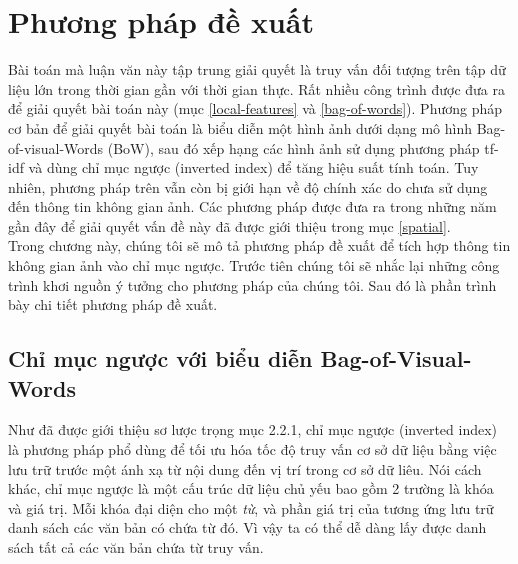 \chapter{Phương pháp đề xuất}
\label{chapter:proposed}
\ifpdf
    \graphicspath{{Chapter3/Chapter3Figs/PNG/}{Chapter3/Chapter3Figs/PDF/}{Chapter3/Chapter3Figs/}}
\else
    \graphicspath{{Chapter3/Chapter3Figs/EPS/}{Chapter3/Chapter3Figs/}}
\fi


Bài toán mà luận văn này tập trung giải quyết là truy vấn đối tượng trên tập dữ liệu lớn trong thời gian gần với thời gian thực. Rất nhiều công trình được đưa ra để giải quyết bài toán này (mục \ref{local-features} và \ref{bag-of-words}). Phương pháp cơ bản để giải quyết bài toán là biểu diễn một hình ảnh dưới dạng mô hình Bag-of-visual-Words (BoW), sau đó xếp hạng các hình ảnh sử dụng phương pháp tf-idf và dùng chỉ mục ngược (inverted index) để tăng hiệu suất tính toán. Tuy nhiên, phương pháp trên vẫn còn bị giới hạn về độ chính xác do chưa sử dụng đến thông tin không gian ảnh. Các phương pháp được đưa ra trong những năm gần đây để giải quyết vấn đề này đã được giới thiệu trong mục \ref{spatial}.\\

Trong chương này, chúng tôi sẽ mô tả phương pháp đề xuất để tích hợp thông tin không gian ảnh vào chỉ mục ngược. Trước tiên chúng tôi sẽ nhắc lại những công trình khơi nguồn ý tưởng cho phương pháp của chúng tôi. Sau đó là phần trình bày chi tiết phương pháp đề xuất.

\section{Chỉ mục ngược với biểu diễn Bag-of-Visual-Words}
Như đã được giới thiệu sơ lược trọng mục 2.2.1, chỉ mục ngược (inverted index) là phương pháp phổ dùng để tối ưu hóa tốc độ truy vấn cơ sở dữ liệu bằng việc lưu trữ trước một ánh xạ từ nội dung đến vị trí trong cơ sở dữ liêu. Nói cách khác, chỉ mục ngược là một cấu trúc dữ liệu chủ yếu bao gồm 2 trường là khóa và giá trị. Mỗi khóa đại diện cho một \textit{từ}, và phần giá trị của tương ứng lưu trữ danh sách các văn bản có chứa từ đó. Vì vậy ta có thể dễ dàng lấy được danh sách tất cả các văn bản chứa từ truy vấn.

